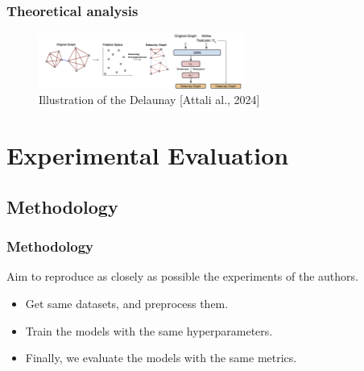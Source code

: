 \documentclass[10pt, aspectratio = 169]{beamer}
\begin{document}
\begin{frame}
\begin{columns}
\begin{column}{0.4\textwidth}
        \end{column}
    \end{columns}

\end{frame}

\begin{frame}
    \frametitle{Theoretical analysis}
    \begin{figure}
        \includegraphics[width=0.6\textwidth]{figures/Delaunay-Rewiring.png}
        \caption{Illustration of the Delaunay [Attali al., 2024] \cite{attali2024delaunay}}
    \end{figure}

\end{frame}


\section{Experimental Evaluation}
\subsection{Methodology}
\begin{frame}
    \frametitle{Methodology}
    Aim  to reproduce as closely as possible the experiments of the authors. 
    \begin{itemize}
        \item Get same datasets, and preprocess them.
        \item Train the models with the same hyperparameters.
        \item Finally, we evaluate the models with the same metrics.
    \end{itemize}

        
\end{frame}
\end{document}
